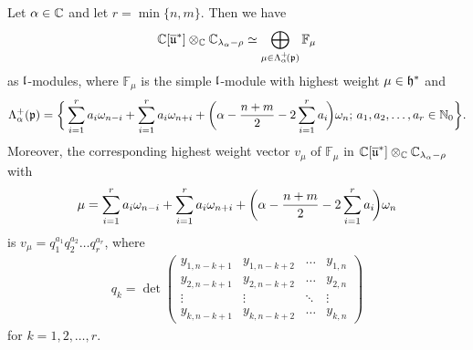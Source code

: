 \begin{proposition}\label{prop:C[u] decomposition AGS}
Let $\alpha \in \mathbb{C}$ and let $r=\min\{n,m\}$. Then we have
\begin{align}
   \mathbb{C}[\overline{\mathfrak{u}}^*] \otimes_{\mathbb{C}} \mathbb{C}_{\lambda_\alpha-\rho} \simeq \bigoplus_{\mu \in \Lambda^+_\alpha\!(\mathfrak{p})} \mathbb{F}_\mu
\end{align}
as $\mathfrak{l}$-modules, where $\mathbb{F}_\mu$ is the simple $\mathfrak{l}$-module with highest weight $\mu \in \mathfrak{h}^*$ and
\begin{align}
 \Lambda^+_\alpha(\mathfrak{p}) = \bigg\{\sum_{i=1}^r a_i \omega_{n-i} + \sum_{i=1}^r a_i \omega_{n+i} + \bigg(\alpha - {n+m \over 2} - 2 \sum_{i=1}^r a_i\!\bigg) \omega_n;\, a_1,a_2,\dots,a_r \in \mathbb{N}_0 \bigg\}.
\end{align}
Moreover, the corresponding highest weight vector $v_\mu$ of $\mathbb{F}_\mu$ in $\mathbb{C}[\overline{\mathfrak{u}}^*] \otimes_{\mathbb{C}} \mathbb{C}_{\lambda_\alpha-\rho}$ with
\begin{align}
\mu=\sum_{i=1}^r a_i \omega_{n-i} + \sum_{i=1}^r a_i \omega_{n+i} + \bigg(\alpha - {n+m \over 2} - 2 \sum_{i=1}^r a_i\!\bigg) \omega_n
\end{align}
is $v_\mu=q_1^{a_1}q_2^{a_2} \dots q_r^{a_r}$, where
\begin{align} \label{eq:generators hwv AGS}
  q_k = \det\!
  \begin{pmatrix}
    y_{1,n-k+1} & y_{1,n-k+2} & \dots & y_{1,n}\\
    y_{2,n-k+1} & y_{2,n-k+2} & \dots & y_{2,n} \\
    \vdots & \vdots & \ddots & \vdots \\
    y_{k,n-k+1} & y_{k,n-k+2}&  \dots & y_{k,n}
  \end{pmatrix}
\end{align}
for $k=1,2,\dots,r$.
\end{proposition}

